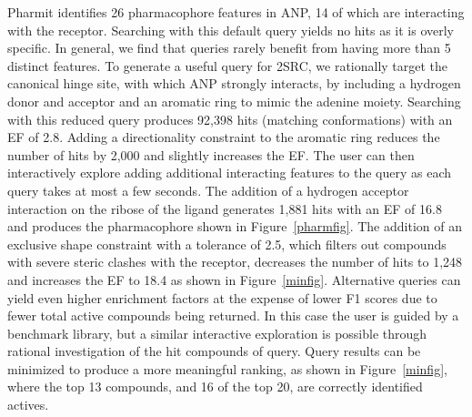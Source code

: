   Pharmit identifies 26 pharmacophore features in ANP, 14 of which are interacting with the receptor.  Searching with this default query yields no hits as it is overly specific.  In general, we find that queries rarely benefit from having more than 5 distinct features.
  To generate a useful query for 2SRC, we rationally target the canonical hinge site, with which ANP strongly interacts, by including a hydrogen donor and acceptor and an aromatic ring to mimic the adenine moiety.  Searching with this reduced query produces 92,398 hits (matching conformations) with an EF of 2.8.  Adding a directionality constraint to the aromatic ring reduces the number of hits by 2,000 and slightly increases the EF.  The user can then interactively explore adding additional interacting features to the query as each query takes at most a few seconds.  The addition of a hydrogen acceptor interaction on the ribose of the ligand generates 1,881 hits with an EF of 16.8 and produces the pharmacophore shown in Figure~\ref{pharmfig}.  The addition of an exclusive shape constraint with a tolerance of 2.5, which filters out compounds with severe steric clashes with the receptor, decreases the number of hits to 1,248 and increases the EF to 18.4 as shown in Figure~\ref{minfig}. Alternative queries can yield even higher enrichment factors at the expense of lower F1 scores due to fewer total active compounds being returned.  In this case the user is guided by a benchmark library, but a similar interactive exploration is possible through rational investigation of the hit compounds of query.
Query results can be minimized to produce a more meaningful ranking, as shown in Figure~\ref{minfig}, where the top 13 compounds, and 16 of the top 20, are correctly identified actives. 
  
